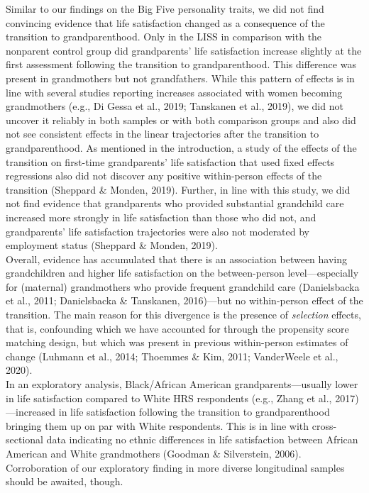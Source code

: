 \documentclass[
  english,
  man,floatsintext]{apa7}
\begin{document}
Similar to our findings on the Big Five personality traits, we did not find convincing evidence that life satisfaction changed as a consequence of the transition to grandparenthood. Only in the LISS in comparison with the nonparent control group did grandparents' life satisfaction increase slightly at the first assessment following the transition to grandparenthood. This difference was present in grandmothers but not grandfathers. While this pattern of effects is in line with several studies reporting increases associated with women becoming grandmothers (e.g., Di Gessa et al., 2019; Tanskanen et al., 2019), we did not uncover it reliably in both samples or with both comparison groups and also did not see consistent effects in the linear trajectories after the transition to grandparenthood. As mentioned in the introduction, a study of the effects of the transition on first-time grandparents' life satisfaction that used fixed effects regressions also did not discover any positive within-person effects of the transition (Sheppard \& Monden, 2019). Further, in line with this study, we did not find evidence that grandparents who provided substantial grandchild care increased more strongly in life satisfaction than those who did not, and grandparents' life satisfaction trajectories were also not moderated by employment status (Sheppard \& Monden, 2019).\\
Overall, evidence has accumulated that there is an association between having grandchildren and higher life satisfaction on the between-person level---especially for (maternal) grandmothers who provide frequent grandchild care (Danielsbacka et al., 2011; Danielsbacka \& Tanskanen, 2016)---but no within-person effect of the transition. The main reason for this divergence is the presence of \emph{selection} effects, that is, confounding which we have accounted for through the propensity score matching design, but which was present in previous within-person estimates of change (Luhmann et al., 2014; Thoemmes \& Kim, 2011; VanderWeele et al., 2020).\\
In an exploratory analysis, Black/African American grandparents---usually lower in life satisfaction compared to White HRS respondents (e.g., Zhang et al., 2017)---increased in life satisfaction following the transition to grandparenthood bringing them up on par with White respondents. This is in line with cross-sectional data indicating no ethnic differences in life satisfaction between African American and White grandmothers (Goodman \& Silverstein, 2006). Corroboration of our exploratory finding in more diverse longitudinal samples should be awaited, though.
\end{document}

